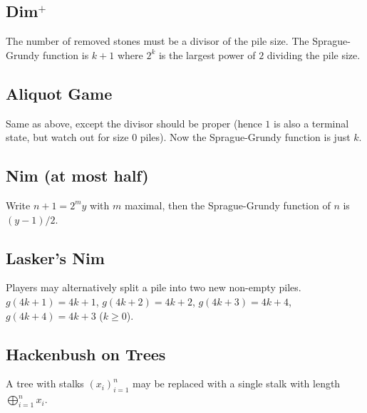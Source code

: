 {    \subsection{Dim$^+$}
    The number of removed stones must be a divisor of the pile size. The Sprague-Grundy function is $k+1$ where $2^k$ is the largest power of $2$ dividing the pile size.
    \subsection{Aliquot Game}
    Same as above, except the divisor should be proper (hence $1$ is also a terminal state, but watch out for size $0$ piles). Now the Sprague-Grundy function is just $k$.
    \subsection{Nim (at most half)}
    Write $n+1 = 2^my$ with $m$ maximal, then the Sprague-Grundy function of $n$ is $(y - 1) / 2$.
    \subsection{Lasker's Nim}
    Players may alternatively split a pile into two new non-empty piles. $g(4k+1) = 4k+1$, $g(4k+2) = 4k+2$, $g(4k+3) = 4k+4$, $g(4k+4) = 4k+3$ ($k\geq 0$).
    \subsection{Hackenbush on Trees}
    A tree with stalks $(x_i)_{i=1}^n$ may be replaced with a single stalk with length $\bigoplus_{i=1}^n x_i$.

	}
